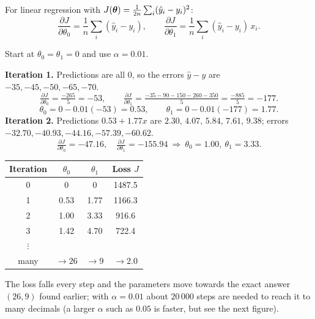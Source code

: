 For linear regression with $J(\boldsymbol{\theta})=\frac1{2n}\sum_i(\hat y_i-y_i)^2$:
\[
\frac{\partial J}{\partial\theta_0}=\frac1n\sum_i(\hat y_i-y_i),\qquad
\frac{\partial J}{\partial\theta_1}=\frac1n\sum_i(\hat y_i-y_i)\,x_i .
\]

\begin{example}
Start at $\theta_0=\theta_1=0$ and use $\alpha=0.01$.\par
\textbf{Iteration 1.} Predictions are all $0$, so the errors $\hat y-y$ are $-35,-45,-50,-65,-70$.
\[
\tfrac{\partial J}{\partial\theta_0}=\tfrac{-265}{5}=-53,\qquad
\tfrac{\partial J}{\partial\theta_1}=\tfrac{-35-90-150-260-350}{5}=\tfrac{-885}{5}=-177 .
\]
\[
\theta_0=0-0.01(-53)=0.53,\qquad\theta_1=0-0.01(-177)=1.77 .
\]
\textbf{Iteration 2.} Predictions $0.53+1.77x$ are $2.30,\,4.07,\,5.84,\,7.61,\,9.38$; errors $-32.70,-40.93,-44.16,-57.39,-60.62$.
\[
\tfrac{\partial J}{\partial\theta_0}=-47.16,\quad\tfrac{\partial J}{\partial\theta_1}=-155.94\ \Rightarrow\ \theta_0=1.00,\ \theta_1=3.33 .
\]
\begin{center}
\begin{tabular}{@{}cccc@{}}
\toprule
\textbf{Iteration} & $\theta_0$ & $\theta_1$ & Loss $J$\\
\midrule
0 & 0 & 0 & 1487.5\\
1 & 0.53 & 1.77 & 1166.3\\
2 & 1.00 & 3.33 & 916.6\\
3 & 1.42 & 4.70 & 722.4\\
$\vdots$ & & & \\
many & $\to26$ & $\to9$ & $\to2.0$\\
\bottomrule
\end{tabular}
\end{center}
The loss falls every step and the parameters move towards the exact answer $(26,9)$ found earlier; with $\alpha=0.01$ about $20\,000$ steps are needed to reach it to many decimals (a larger $\alpha$ such as $0.05$ is faster, but see the next figure).
\end{example}

